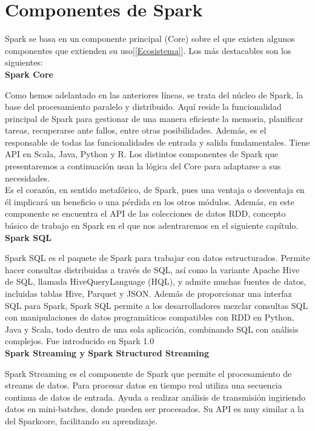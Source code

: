 \chapter{Componentes de Spark}

Spark se basa en un componente principal (Core) sobre el que existen algunos componentes que extienden su uso[\ref{Ecosistema}]. Los más destacables son los siguientes:\\

\textbf{Spark Core}

Como hemos adelantado en las anteriores líneas, se trata del núcleo de Spark, la base del procesamiento paralelo y distribuido. Aquí reside la funcionalidad principal de Spark para gestionar de una manera eficiente la memoria, planificar tareas, recuperarse ante fallos, entre otras posibilidades. Además, es el responsable de todas las funcionalidades de entrada y salida fundamentales. Tiene API en Scala, Java, Python y R. Los distintos componentes de Spark que presentaremos a continuación usan la lógica del Core para adaptarse a sus necesidades.\\

Es el corazón, en sentido metafórico, de Spark, pues una ventaja o desventaja en él implicará un beneficio o una pérdida en los otros módulos.  Además, en este componente se encuentra el API de las colecciones de datos RDD, concepto básico de trabajo en Spark en el que nos adentraremos en el siguiente capítulo.\\

\textbf{Spark SQL}

Spark SQL es el paquete de Spark para trabajar con datos estructurados. Permite hacer consultas distribuidas a través de SQL, así como la variante Apache Hive de SQL, llamada HiveQueryLanguage (HQL), y admite muchas fuentes de datos, incluidas tablas Hive, Parquet y JSON. Además de proporcionar una interfaz SQL para Spark, Spark SQL permite a los desarrolladores mezclar consultas SQL con manipulaciones de datos programáticos compatibles con RDD en Python, Java y Scala, todo dentro de una sola aplicación, combinando SQL con análisis complejos. Fue introducido en Spark 1.0\\

\textbf{Spark Streaming y Spark Structured Streaming}

Spark Streaming es el componente de Spark que permite el procesamiento de streams de datos. Para procesar datos en tiempo real utiliza una secuencia continua de datos de entrada. Ayuda a realizar análisis de transmisión ingiriendo datos en mini-batches, donde pueden ser procesados. Su API es muy similar a la del Sparkcore, facilitando su aprendizaje.\\


